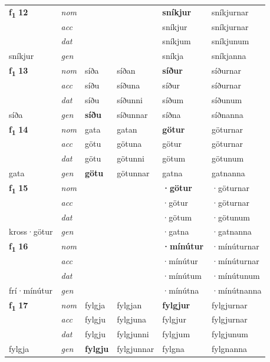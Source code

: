 \begin{longtable}[l]{X>{\footnotesize\itshape}XXXXX}
\multirow{3}{*}{{{\textbf{f{\textsubscript{1}}} \Large{\textbf{12}}}}} & nom &  &  & \textbf{sníkjur} & sníkjurnar \\*
 & acc &  &  & sníkjur & sníkjurnar \\*
 & dat &  &  & sníkjum & sníkjunum \\*
 {\footnotesize{sníkjur}} & gen & \textbf{} &  & sníkja & sníkjanna \\
\midrule

\multirow{3}{*}{{{\textbf{f{\textsubscript{1}}} \Large{\textbf{13}}}}} & nom & síða & síðan & \textbf{síður} & síðurnar \\*
 & acc & síðu & síðuna & síður & síðurnar \\*
 & dat & síðu & síðunni & síðum & síðunum \\*
 {\footnotesize{síða}} & gen & \textbf{síðu} & síðunnar & síðna & síðnanna \\
\midrule

\multirow{3}{*}{{{\textbf{f{\textsubscript{1}}} \Large{\textbf{14}}}}} & nom & gata & gatan & \textbf{götur} & göturnar \\*
 & acc & götu & götuna & götur & göturnar \\*
 & dat & götu & götunni & götum & götunum \\*
 {\footnotesize{gata}} & gen & \textbf{götu} & götunnar & gatna & gatnanna \\
\midrule

\multirow{3}{*}{{{\textbf{f{\textsubscript{1}}} \Large{\textbf{15}}}}} & nom &  &  & \textbf{·götur} & ·göturnar \\*
 & acc &  &  & ·götur & ·göturnar \\*
 & dat &  &  & ·götum & ·götunum \\*
 {\footnotesize{kross\allowbreak ·götur}} & gen & \textbf{} &  & ·gatna & ·gatnanna \\
\midrule

\multirow{3}{*}{{{\textbf{f{\textsubscript{1}}} \Large{\textbf{16}}}}} & nom &  &  & \textbf{·mínútur} & ·mínúturnar \\*
 & acc &  &  & ·mínútur & ·mínúturnar \\*
 & dat &  &  & ·mínútum & ·mínútunum \\*
 {\footnotesize{frí\allowbreak ·mínútur}} & gen & \textbf{} &  & ·mínútna & ·mínútnanna \\
\midrule

\multirow{3}{*}{{{\textbf{f{\textsubscript{1}}} \Large{\textbf{17}}}}} & nom & fylgja & fylgjan & \textbf{fylgjur} & fylgjurnar \\*
 & acc & fylgju & fylgjuna & fylgjur & fylgjurnar \\*
 & dat & fylgju & fylgjunni & fylgjum & fylgjunum \\*
 {\footnotesize{fylgja}} & gen & \textbf{fylgju} & fylgjunnar & fylgna & fylgnanna \\
\midrule


\end{longtable}

